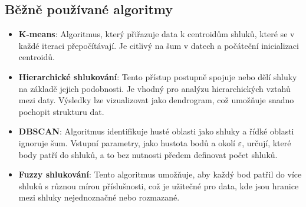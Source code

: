 \subsection{Běžně používané algoritmy}

\begin{itemize}
    \item \textbf{K-means}: Algoritmus, který přiřazuje data k centroidům shluků, které se v každé iteraci přepočítávají. Je citlivý na šum v datech a počáteční inicializaci centroidů.
    \item \textbf{Hierarchické shlukování}: Tento přístup postupně spojuje nebo dělí shluky na základě jejich podobnosti. Je vhodný pro analýzu hierarchických vztahů mezi daty. Výsledky lze vizualizovat jako dendrogram, což umožňuje snadno pochopit strukturu dat.
    \item \textbf{DBSCAN}: Algoritmus identifikuje husté oblasti jako shluky a řídké oblasti ignoruje šum. Vstupní parametry, jako hustota bodů a okolí \(\varepsilon\), určují, které body patří do shluků, a to bez nutnosti předem definovat počet shluků.
    \item \textbf{Fuzzy shlukování}: Tento algoritmus umožňuje, aby každý bod patřil do více shluků s různou mírou příslušnosti, což je užitečné pro data, kde jsou hranice mezi shluky nejednoznačné nebo rozmazané.\cite{koutroumbas2008}
\end{itemize}

